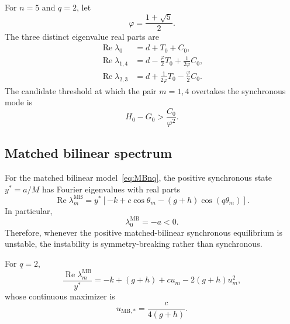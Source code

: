 \documentclass[11pt, reqno]{amsart}
\theoremstyle{definition}
\theoremstyle{remark}
\newcommand{\MB}{\mathrm{MB}}
\newcommand{\Ree}{\operatorname{Re}}
\begin{document}
	For $n=5$ and $q=2$, let
	\[
	\varphi=\frac{1+\sqrt5}{2}.
	\]
	The three distinct eigenvalue real parts are
	\begin{align}
		\label{eq:five-real-0}
		\Ree\lambda_0
		&=d+T_0+C_0,\\
		\label{eq:five-real-1}
		\Ree\lambda_{1,4}
		&=d-\frac{\varphi}{2}T_0+\frac{1}{2\varphi}C_0,\\
		\label{eq:five-real-2}
		\Ree\lambda_{2,3}
		&=d+\frac{1}{2\varphi}T_0-\frac{\varphi}{2}C_0.
	\end{align}
	The candidate threshold at which the pair $m=1,4$ overtakes the synchronous
	mode is
	\begin{equation}
		\label{eq:five-threshold}
		H_0-G_0>\frac{C_0}{\varphi^2}.
	\end{equation}
	
	
	\subsection{Matched bilinear spectrum}
	
	For the matched bilinear model~\eqref{eq:MBnq}, the positive synchronous state
	$y^*=a/M$ has Fourier eigenvalues with real parts
	\begin{equation}
		\label{eq:matched-bilinear-real}
		\Ree\lambda_m^{\MB}
		=
		y^*
		\left[
		-k+c\cos\theta_m-(g+h)\cos(q\theta_m)
		\right].
	\end{equation}
	In particular,
	\begin{equation}
		\label{eq:matched-bilinear-uniform}
		\lambda_0^{\MB}=-a<0.
	\end{equation}
	Therefore, whenever the positive matched-bilinear synchronous equilibrium is
	unstable, the instability is symmetry-breaking rather than synchronous.
	
	For $q=2$,
	\begin{equation}
		\label{eq:matched-bilinear-quadratic}
		\frac{\Ree\lambda_m^{\MB}}{y^*}
		=
		-k+(g+h)+c u_m-2(g+h)u_m^2,
	\end{equation}
	whose continuous maximizer is
	\begin{equation}
		\label{eq:bilinear-u-star}
		u_{\MB,*}=\frac{c}{4(g+h)}.
	\end{equation}
	
	
\end{document}

